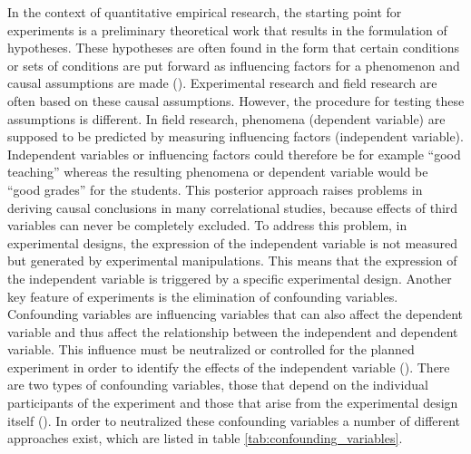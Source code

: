In the context of quantitative empirical research, the starting point for experiments is a preliminary theoretical work that results in the formulation of hypotheses. These hypotheses are often found in the form that certain conditions or sets of conditions are put forward as influencing factors for a phenomenon and causal assumptions are made (\cite{Gniewosz.2011}). Experimental research and field research are often based on these causal assumptions. However, the procedure for testing these assumptions is different. In field research, phenomena (dependent variable) are supposed to be predicted by measuring influencing factors (independent variable). Independent variables or influencing factors could therefore be for example \enquote{good teaching} whereas the resulting phenomena or dependent variable would be \enquote{good grades} for the students. This posterior approach raises problems in deriving causal conclusions in many correlational studies, because effects of third variables can never be completely excluded. To address this problem, in experimental designs, the expression of the independent variable is not measured but generated by experimental manipulations. This means that the expression of the independent variable is triggered by a specific experimental design. Another key feature of experiments is the elimination of confounding variables. Confounding variables are influencing variables that can also affect the dependent variable and thus affect the relationship between the independent and dependent variable. This influence must be neutralized or controlled for the planned experiment in order to identify the effects of the independent variable (\cite{Gniewosz.2011}). There are two types of confounding variables, those that depend on the individual participants of the experiment and those that arise from the experimental design itself (\cite{Gniewosz.2011}). In order to neutralized these confounding variables a number of different approaches exist, which are listed in table \ref{tab:confounding_variables}.

